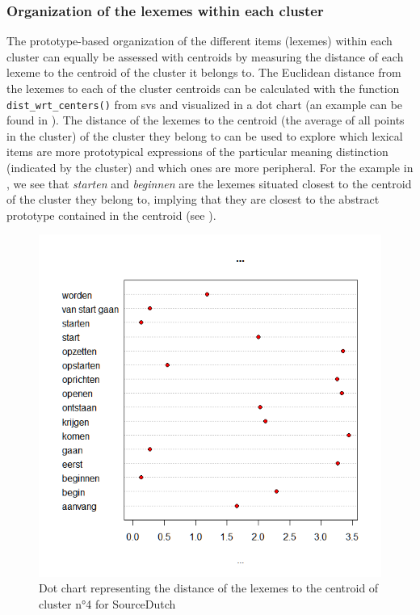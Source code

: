 \subsubsection{Organization of the lexemes within each cluster}
\label{sec:3.8.1.2}
The prototype-based organization of the different items (lexemes) within each cluster can equally be assessed with centroids by measuring the distance of each lexeme to the centroid of the cluster it belongs to. The Euclidean distance from the lexemes to each of the cluster centroids can be calculated with the function \texttt{dist\_wrt\_centers()} from svs and visualized in a dot chart (an example can be found in ). The distance of the lexemes to the centroid (the average of all points in the cluster) of the cluster they belong to can be used to explore which lexical items are more prototypical expressions of the particular meaning distinction (indicated by the cluster) and which ones are more peripheral. For the example in , we see that \textit{starten} and \textit{beginnen} are the lexemes situated closest to the centroid of the cluster they belong to, implying that they are closest to the abstract prototype contained in the centroid (see ).

\begin{figure}
\includegraphics[height=.4\textheight]{figures/Vandevoorde2-img49.png}
\caption{\label{fig:3:49}  Dot chart representing the distance of the lexemes to the centroid of cluster n°4 for SourceDutch}
\end{figure}

